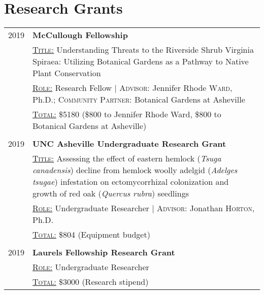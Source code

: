 \section{Research Grants}

\setlength{\arrayrulewidth}{.01pt}
\setlength{\tabcolsep}{8pt}

\noindent
\begin{tabular}{r|L{16cm}}

    2019 & \textbf{McCullough Fellowship}\hspace*{0.25em} \\
    & \textsc{\underline{Title:}} Understanding Threats to the Riverside Shrub Virginia Spiraea: Utilizing Botanical Gardens as a Pathway to Native Plant Conservation\\
    & \textsc{\underline{Role:}} Research Fellow{ | \small \textsc{Advisor:} Jennifer Rhode \textsc{Ward}, Ph.D.; \textsc{Community Partner:} Botanical Gardens at Asheville}\\
    & \textsc{\underline{Total:}} \$5180 (\$800 to Jennifer Rhode Ward, \$800 to Botanical Gardens at Asheville)\\&\\
    
    2019 & \textbf{UNC Asheville Undergraduate Research Grant} \\
    & \textsc{\underline{Title:}} Assessing the effect of eastern hemlock (\textit{Tsuga canadensis}) decline from hemlock woolly adelgid (\textit{Adelges tsugae}) infestation on ectomycorrhizal colonization and growth of red oak (\textit{Quercus rubra}) seedlings\\
    & \textsc{\underline{Role:}} Undergraduate Researcher{ | \small \textsc{Advisor:} Jonathan \textsc{Horton}, Ph.D.}\\
    & \textsc{\underline{Total:}} \$804 (Equipment budget)
\\&\\

2019 & \textbf{Laurels Fellowship Research Grant} \\
    & \textsc{\underline{Role:}} Undergraduate Researcher\\
    & \textsc{\underline{Total:}} \$3000 (Research stipend)\\

\end{tabular}